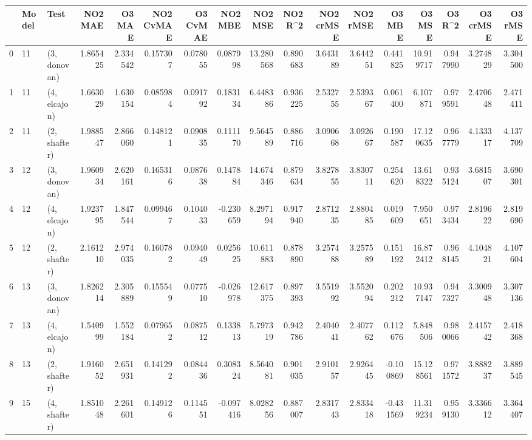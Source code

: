 \begin{tabular}{lllrrrrrrrrrrrrrr}
\toprule
{} & Model &          Test &   NO2 MAE &    O3 MAE &  NO2 CvMAE &  O3 CvMAE &   NO2 MBE &    NO2 MSE &   NO2 R\textasciicircum2 &  NO2 crMSE &  NO2 rMSE &    O3 MBE &     O3 MSE &    O3 R\textasciicircum2 &  O3 crMSE &   O3 rMSE \\
\midrule
0  &    11 &  (3, donovan) &  1.865425 &  2.334542 &   0.157307 &  0.078055 &  0.087998 &  13.280568 &  0.890683 &   3.643189 &  3.644251 &  0.441825 &  10.919717 &  0.947990 &  3.274829 &  3.304500 \\
1  &    11 &  (4, elcajon) &  1.663029 &  1.630154 &   0.085984 &  0.091792 &  0.183134 &   6.448386 &  0.936225 &   2.532755 &  2.539367 &  0.061400 &   6.107871 &  0.979591 &  2.470648 &  2.471411 \\
2  &    11 &  (2, shafter) &  1.988547 &  2.866060 &   0.148121 &  0.090835 &  0.111170 &   9.564589 &  0.886716 &   3.090668 &  3.092667 &  0.190587 &  17.120635 &  0.967779 &  4.133317 &  4.137709 \\
3  &    12 &  (3, donovan) &  1.960934 &  2.620161 &   0.165316 &  0.087638 &  0.147884 &  14.674346 &  0.879634 &   3.827855 &  3.830711 &  0.254620 &  13.618322 &  0.935124 &  3.681507 &  3.690301 \\
4  &    12 &  (4, elcajon) &  1.923795 &  1.847544 &   0.099467 &  0.104033 & -0.230659 &   8.297194 &  0.917940 &   2.871235 &  2.880485 &  0.019609 &   7.950651 &  0.973434 &  2.819622 &  2.819690 \\
5  &    12 &  (2, shafter) &  2.161210 &  2.974035 &   0.160782 &  0.094049 &  0.025625 &  10.611883 &  0.878890 &   3.257488 &  3.257589 &  0.151192 &  16.872412 &  0.968145 &  4.104821 &  4.107604 \\
6  &    13 &  (3, donovan) &  1.826214 &  2.305889 &   0.155549 &  0.077510 & -0.026978 &  12.617375 &  0.897393 &   3.551992 &  3.552094 &  0.202212 &  10.937147 &  0.947327 &  3.300948 &  3.307136 \\
7  &    13 &  (4, elcajon) &  1.540999 &  1.552184 &   0.079652 &  0.087512 &  0.133813 &   5.797319 &  0.942786 &   2.404041 &  2.407762 &  0.112676 &   5.848506 &  0.980066 &  2.415742 &  2.418368 \\
8  &    13 &  (2, shafter) &  1.916052 &  2.651931 &   0.141292 &  0.084436 &  0.308324 &   8.564081 &  0.901035 &   2.910157 &  2.926445 & -0.100869 &  15.128561 &  0.971572 &  3.888237 &  3.889545 \\
9  &    15 &  (4, shafter) &  1.851048 &  2.261601 &   0.149126 &  0.114551 & -0.097416 &   8.028256 &  0.887007 &   2.831743 &  2.833418 & -0.431569 &  11.319234 &  0.959130 &  3.336612 &  3.364407 \\

\end{tabular}
